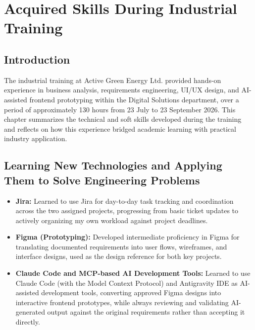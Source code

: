 \chapter{Acquired Skills During Industrial Training}
\label{chapter-4}

\section{Introduction}
\par The industrial training at Active Green Energy Ltd. provided hands-on experience in business analysis, requirements engineering, UI/UX design, and AI-assisted frontend prototyping within the Digital Solutions department, over a period of approximately 130 hours from 23 July to 23 September 2026. This chapter summarizes the technical and soft skills developed during the training and reflects on how this experience bridged academic learning with practical industry application.

\section{Learning New Technologies and Applying Them to Solve Engineering Problems}
\begin{itemize}
    \item \textbf{Jira:} Learned to use Jira for day-to-day task tracking and coordination across the two assigned projects, progressing from basic ticket updates to actively organizing my own workload against project deadlines.
    \item \textbf{Figma (Prototyping):} Developed intermediate proficiency in Figma for translating documented requirements into user flows, wireframes, and interface designs, used as the design reference for both key projects.
    \item \textbf{Claude Code and MCP-based AI Development Tools:} Learned to use Claude Code (with the Model Context Protocol) and Antigravity IDE as AI-assisted development tools, converting approved Figma designs into interactive frontend prototypes, while always reviewing and validating AI-generated output against the original requirements rather than accepting it directly.
\end{itemize}


